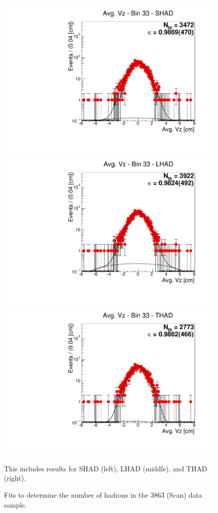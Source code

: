 \begin{figure}[H]
\centering
\includegraphics[scale=0.25]{figures/plots/nonDDbar_fit_results/scan/fit_scan_33_data_SHAD.pdf}
\hspace{-0.5cm}
\includegraphics[scale=0.25]{figures/plots/nonDDbar_fit_results/scan/fit_scan_33_data_LHAD.pdf}
\hspace{-0.5cm}
\includegraphics[scale=0.25]{figures/plots/nonDDbar_fit_results/scan/fit_scan_33_data_THAD.pdf}
\caption{Fits to determine the number of hadrons in the 3863 (Scan) data sample.}
{This includes results for SHAD (left), LHAD (middle), and THAD (right).}
\label{fig:hadron_fits_scan_33}
\end{figure}
